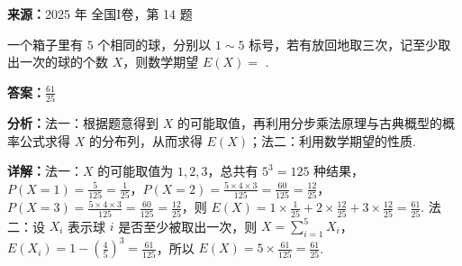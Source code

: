 \begin{question}[points=5]
\textbf{来源：}2025 年 全国I卷，第 14 题\par
一个箱子里有 $5$ 个相同的球，分别以 $1\sim5$ 标号，若有放回地取三次，记至少取出一次的球的个数 $X$，则数学期望 $E(X) =$ .
\fillin[{$\frac{61}{25}$}]
\begin{solution}
\textbf{答案：}$\frac{61}{25}$

\textbf{分析：}法一：根据题意得到 $X$ 的可能取值，再利用分步乘法原理与古典概型的概率公式求得 $X$ 的分布列，从而求得 $E(X)$；法二：利用数学期望的性质.

\textbf{详解：}法一：$X$ 的可能取值为 $1,2,3$，总共有 $5^3=125$ 种结果，$P(X=1)=\frac{5}{125}=\frac{1}{25}$，$P(X=2)=\frac{5\times4\times3}{125}=\frac{60}{125}=\frac{12}{25}$，$P(X=3)=\frac{5\times4\times3}{125}=\frac{60}{125}=\frac{12}{25}$，则 $E(X)=1\times\frac{1}{25}+2\times\frac{12}{25}+3\times\frac{12}{25}=\frac{61}{25}$. 法二：设 $X_i$ 表示球 $i$ 是否至少被取出一次，则 $X=\sum_{i=1}^5 X_i$，$E(X_i)=1-\left(\frac{4}{5}\right)^3 = \frac{61}{125}$，所以 $E(X)=5\times\frac{61}{125}=\frac{61}{25}$.
\end{solution}
\end{question}

